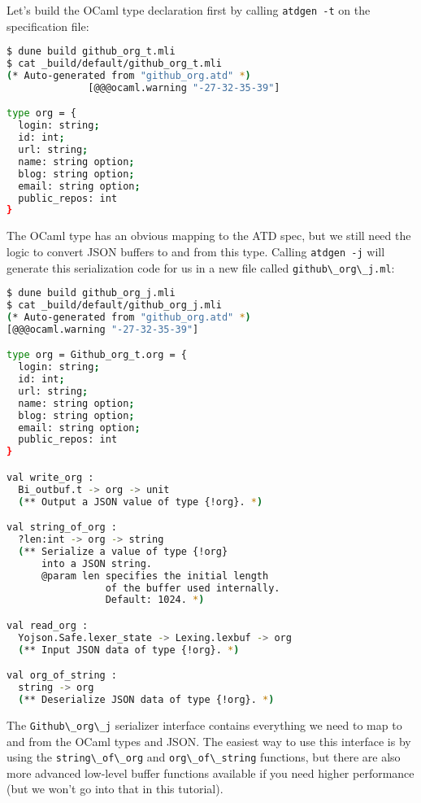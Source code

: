 Let's build the OCaml type declaration first by calling
\passthrough{\lstinline!atdgen -t!} on the specification file:

\begin{lstlisting}[language=bash]
$ dune build github_org_t.mli
$ cat _build/default/github_org_t.mli
(* Auto-generated from "github_org.atd" *)
              [@@@ocaml.warning "-27-32-35-39"]

type org = {
  login: string;
  id: int;
  url: string;
  name: string option;
  blog: string option;
  email: string option;
  public_repos: int
}
\end{lstlisting}

The OCaml type has an obvious mapping to the ATD spec, but we still need
the logic to convert JSON buffers to and from this type. Calling
\passthrough{\lstinline!atdgen -j!} will generate this serialization
code for us in a new file called
\passthrough{\lstinline!github\_org\_j.ml!}:

\begin{lstlisting}[language=bash]
$ dune build github_org_j.mli
$ cat _build/default/github_org_j.mli
(* Auto-generated from "github_org.atd" *)
[@@@ocaml.warning "-27-32-35-39"]

type org = Github_org_t.org = {
  login: string;
  id: int;
  url: string;
  name: string option;
  blog: string option;
  email: string option;
  public_repos: int
}

val write_org :
  Bi_outbuf.t -> org -> unit
  (** Output a JSON value of type {!org}. *)

val string_of_org :
  ?len:int -> org -> string
  (** Serialize a value of type {!org}
      into a JSON string.
      @param len specifies the initial length
                 of the buffer used internally.
                 Default: 1024. *)

val read_org :
  Yojson.Safe.lexer_state -> Lexing.lexbuf -> org
  (** Input JSON data of type {!org}. *)

val org_of_string :
  string -> org
  (** Deserialize JSON data of type {!org}. *)
\end{lstlisting}

The \passthrough{\lstinline!Github\_org\_j!} serializer interface
contains everything we need to map to and from the OCaml types and JSON.
The easiest way to use this interface is by using the
\passthrough{\lstinline!string\_of\_org!} and
\passthrough{\lstinline!org\_of\_string!} functions, but there are also
more advanced low-level buffer functions available if you need higher
performance (but we won't go into that in this tutorial).

